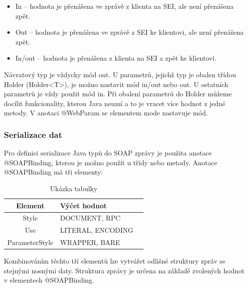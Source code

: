 \documentclass[11pt,twoside,a4paper]{book}
\begin{document}
\begin{itemize}
  \item In – hodnota je přenášena ve zprávě z klienta na SEI, ale není přenášena zpět.
  \item Out – hodnota je přenášena ve zprávě z SEI ke klientovi, ale není přenášena zpět.
  \item In/out – hodnota je přenášena z klienta na SEI a zpět ke klientovi.
\end{itemize}

Návratový typ je vždycky mód out. U parametrů, jejichž typ je obalen třídou Holder
(Holder<T>), je možno nastavit mód in/out nebo out. U ostatních parametrů je vždy použit
mód in. Při obalení parametrů do Holder můžeme docílit funkcionality, kterou Java neumí a to
je vracet více hodnot z jedné metody. V anotaci @WebParam se elementem mode nastavuje
mód.

\subsubsection{Serializace dat}

Pro definici serializace Java typů do SOAP zprávy je použita anotace @SOAPBinding, kterou
je možno použít u třídy nebo metody. Anotace @SOAPBinding má tři elementy:

\begin{table}
\begin{center}
\begin{tabular}{|c|l|l|}
\hline
\textbf{Element} & \textbf{Výčet hodnot} \\
\hline
Style & DOCUMENT, RPC \\
\hline
Use & LITERAL, ENCODING \\
\hline
ParameterStyle & WRAPPER, BARE \\
\hline
\end{tabular}
\end{center}
\caption{Ukázka tabulky}
\label{tab:tab1}
\end{table}

Kombinováním těchto tří elementů lze vytvářet odlišné struktury zpráv se stejnými nosnými
daty. Struktura zprávy je určena na základě zvolených hodnot v elementech @SOAPBinding.
\end{document}
